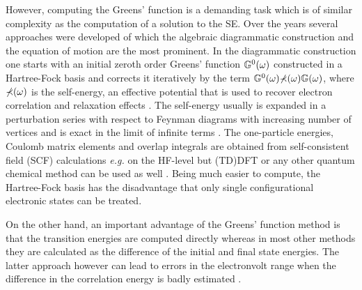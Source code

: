 However, computing the Greens' function is a demanding task which is of similar complexity as the computation of a solution to the SE.
Over the years several approaches were developed of which the algebraic diagrammatic construction \cite{1pGFcederbaum} and the equation of motion \cite{PottsHolland,1pGFcederbaum} are the most prominent.
In the diagrammatic construction one starts with an initial zeroth order Greens' function $\mathbb{G}^0(\omega)$ constructed in a Hartree-Fock basis and corrects it iteratively by the term $\mathbb{G}^0(\omega)\mathbb{\Sigma}(\omega)\mathbb{G}(\omega)$, where $\mathbb{\Sigma}(\omega)$ is the self-energy, an effective potential that is used to recover electron correlation and relaxation effects \cite{GreenBayse}.
The self-energy usually is expanded in a perturbation series with respect to Feynman diagrams with increasing number of vertices and is exact in the limit of infinite terms \cite{bookGF,cederbADC}.
The one-particle energies, Coulomb matrix elements and overlap integrals are obtained from self-consistent field (SCF) calculations \cite{1pGFcederbaum} \textit{e.g.} on the HF-level \cite{GreenBayse} but (TD)DFT or any other quantum chemical method can be used as well \cite{Koerzd1}.
Being much easier to compute, the Hartree-Fock basis has the disadvantage that only single configurational electronic states can be treated.

On the other hand, an important advantage of the Greens' function method is that the transition energies are computed directly whereas in most other methods they are calculated as the difference of the initial and final state energies.
The latter approach however can lead to errors in the electronvolt range when the difference in the correlation energy is badly estimated \cite{1pGFcederbaum}.

